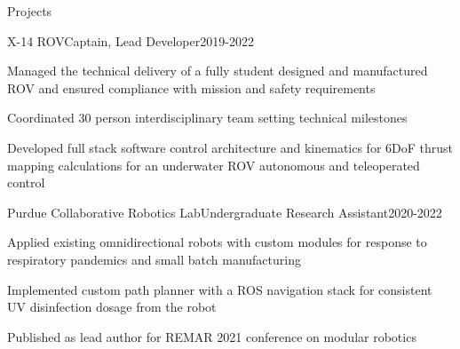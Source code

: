 \documentclass[]{jheidegger-resume}
\begin{document}
\newpage
\begin{section}{Projects}
\begin{subsection_small}{X-14 ROV}{Captain, Lead Developer}{2019-2022}
    \item{Managed the technical delivery of a fully student designed and manufactured ROV and ensured compliance with mission and safety requirements}
    \item{Coordinated 30 person interdisciplinary team setting technical milestones}
    \item{Developed full stack software control architecture and kinematics for 6DoF thrust mapping calculations for an underwater ROV autonomous and teleoperated control} 
\end{subsection_small}
\begin{subsection_small}{Purdue Collaborative Robotics Lab}{Undergraduate Research Assistant}{2020-2022}
    \item{Applied existing omnidirectional robots with custom modules for response to respiratory pandemics and small batch manufacturing}
    \item{Implemented custom path planner with a ROS navigation stack for consistent UV disinfection dosage from the robot}
    \item {Published as lead author for REMAR 2021 conference on modular robotics}
\end{subsection_small}


\end{section}
\end{document}

